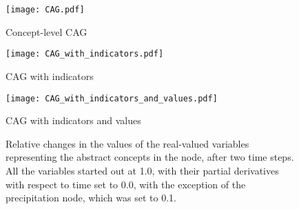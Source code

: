\documentclass{apnotes}
\begin{document}
\begin{figure}
  \centering
  \texttt{[image: CAG.pdf]}
  \caption{Concept-level CAG}
  \label{fig:precipitation_centered_cag}
\end{figure}

\begin{figure}
  \centering
  \texttt{[image: CAG\_with\_indicators.pdf]}
  \caption{CAG with indicators}
\end{figure}

\begin{figure}
  \centering
  \texttt{[image: CAG\_with\_indicators\_and\_values.pdf]}
  \caption{CAG with indicators and values}
\end{figure}

\begin{figure}
  
  \caption{Relative changes in the values of the real-valued variables
  representing the abstract concepts in the node, after two time steps. All the
  variables started out at 1.0, with their partial derivatives with respect to
  time set to 0.0, with the exception of the precipitation node, which was set
  to 0.1.}
\end{figure}
\end{document}
